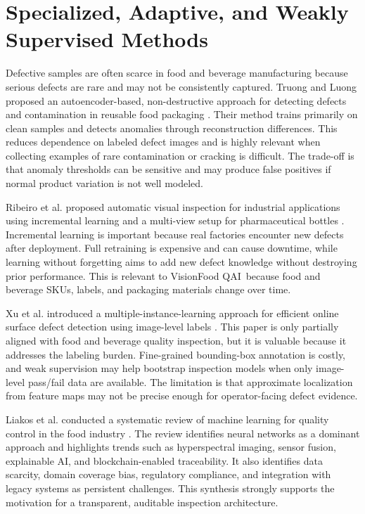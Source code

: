 \documentclass[12pt,a4paper]{report}
\newcommand{\shorttitle}{VisionFood QAI}
\begin{document}
\section{Specialized, Adaptive, and Weakly Supervised Methods}
\label{sec:specialized-methods}

Defective samples are often scarce in food and beverage manufacturing because serious defects are rare and may not be consistently captured. Truong and Luong proposed an autoencoder-based, non-destructive approach for detecting defects and contamination in reusable food packaging \cite{truong2024autoencoder}. Their method trains primarily on clean samples and detects anomalies through reconstruction differences. This reduces dependence on labeled defect images and is highly relevant when collecting examples of rare contamination or cracking is difficult. The trade-off is that anomaly thresholds can be sensitive and may produce false positives if normal product variation is not well modeled.

Ribeiro et al. proposed automatic visual inspection for industrial applications using incremental learning and a multi-view setup for pharmaceutical bottles \cite{ribeiro2025automatic}. Incremental learning is important because real factories encounter new defects after deployment. Full retraining is expensive and can cause downtime, while learning without forgetting aims to add new defect knowledge without destroying prior performance. This is relevant to \shorttitle\ because food and beverage SKUs, labels, and packaging materials change over time.

Xu et al. introduced a multiple-instance-learning approach for efficient online surface defect detection using image-level labels \cite{xu2024mil}. This paper is only partially aligned with food and beverage quality inspection, but it is valuable because it addresses the labeling burden. Fine-grained bounding-box annotation is costly, and weak supervision may help bootstrap inspection models when only image-level pass/fail data are available. The limitation is that approximate localization from feature maps may not be precise enough for operator-facing defect evidence.

Liakos et al. conducted a systematic review of machine learning for quality control in the food industry \cite{liakos2025review}. The review identifies neural networks as a dominant approach and highlights trends such as hyperspectral imaging, sensor fusion, explainable AI, and blockchain-enabled traceability. It also identifies data scarcity, domain coverage bias, regulatory compliance, and integration with legacy systems as persistent challenges. This synthesis strongly supports the motivation for a transparent, auditable inspection architecture.
\end{document}
